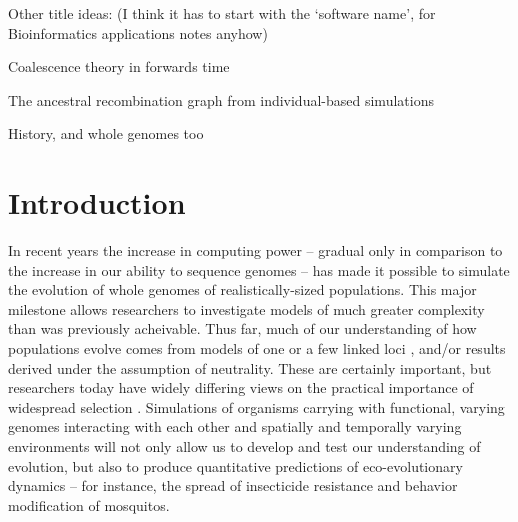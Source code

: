 \documentclass{bioinfo}
\begin{document}
\maketitle

Other title ideas: (I think it has to start with the `software name', for Bioinformatics applications notes anyhow)

Coalescence theory in forwards time

The ancestral recombination graph from individual-based simulations

History, and whole genomes too


\section{Introduction}


In recent years the increase in computing power --
gradual only in comparison to the increase in our ability to sequence genomes --
has made it possible to simulate the evolution of whole genomes of realistically-sized populations.
This major milestone allows researchers to investigate models of much greater complexity
than was previously acheivable.
Thus far, much of our understanding of how populations evolve
comes from models of one or a few linked loci \citep{ewens},
and/or results derived under the assumption of neutrality.
These are certainly important, but researchers today have widely differing views
on the practical importance of widespread selection \citep{encode,graur,backgroundsel}.
Simulations of organisms carrying with functional, varying genomes
interacting with each other and spatially and temporally varying environments
will not only allow us to develop and test our understanding of evolution,
but also to produce quantitative predictions of eco-evolutionary dynamics --
for instance, the spread of insecticide resistance and behavior modification of mosquitos.
\end{document}
